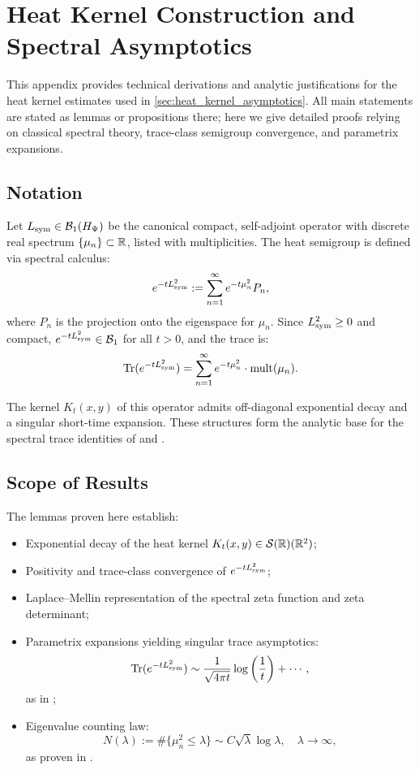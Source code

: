 \section{Heat Kernel Construction and Spectral Asymptotics}
\label{app:heat_kernel_construction}

This appendix provides technical derivations and analytic justifications for the heat kernel estimates used in \cref{sec:heat_kernel_asymptotics}. All main statements are stated as lemmas or propositions there; here we give detailed proofs relying on classical spectral theory, trace-class semigroup convergence, and parametrix expansions.

\subsection*{Notation}

Let \( L_{\mathrm{sym}} \in \mathcal{B}_1(H_{\Psi}) \) be the canonical compact, self-adjoint operator with discrete real spectrum \( \{ \mu_n \} \subset \mathbb{R} \), listed with multiplicities. The heat semigroup is defined via spectral calculus:
\[
e^{-t L_{\mathrm{sym}}^2} := \sum_{n=1}^\infty e^{-t \mu_n^2} P_n,
\]
where \( P_n \) is the projection onto the eigenspace for \( \mu_n \). Since \( L_{\mathrm{sym}}^2 \ge 0 \) and compact, \( e^{-tL_{\mathrm{sym}}^2} \in \mathcal{B}_1 \) for all \( t > 0 \), and the trace is:
\[
\operatorname{Tr}(e^{-t L_{\mathrm{sym}}^2}) = \sum_{n=1}^\infty e^{-t \mu_n^2} \cdot \operatorname{mult}(\mu_n).
\]

The kernel \( K_t(x,y) \) of this operator admits off-diagonal exponential decay and a singular short-time expansion. These structures form the analytic base for the spectral trace identities of  and .

\subsection*{Scope of Results}

The lemmas proven here establish:

\begin{itemize}
  \item Exponential decay of the heat kernel \( K_t(x,y) \in \mathcal{S}(\mathbb{R})(\mathbb{R}^2) \);
  \item Positivity and trace-class convergence of \( e^{-t L_{\mathrm{sym}}^2} \);
  \item Laplace–Mellin representation of the spectral zeta function and zeta determinant;
  \item Parametrix expansions yielding singular trace asymptotics:
  \[
  \operatorname{Tr}(e^{-t L_{\mathrm{sym}}^2}) \sim \frac{1}{\sqrt{4\pi t}} \log\left( \frac{1}{t} \right) + \cdots,
  \]
  as in ;

  \item Eigenvalue counting law:
  \[
  N(\lambda) := \#\{ \mu_n^2 \le \lambda \}
  \sim C \sqrt{\lambda} \log \lambda, \quad \lambda \to \infty,
  \]
  as proven in .
\end{itemize}

